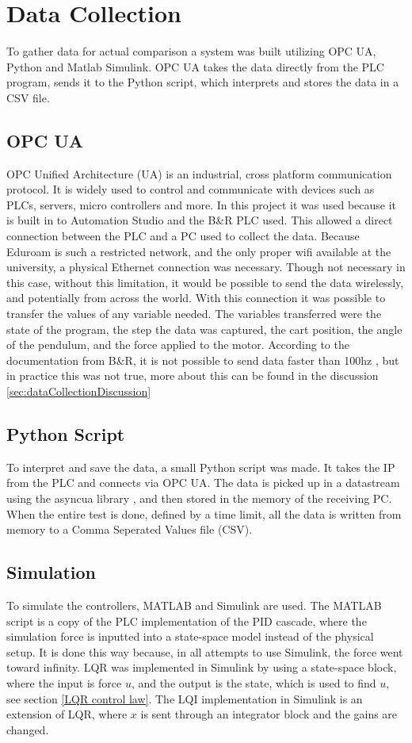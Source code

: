 \chapter{Data Collection}
\label{chap:datacollection}

To gather data for actual comparison a system was built utilizing OPC UA, Python and Matlab Simulink. OPC UA takes the data directly from the PLC program, sends it to the Python script, which interprets and stores the data in a CSV file.

\section{OPC UA}
OPC Unified Architecture (UA) is an industrial, cross platform communication protocol. It is widely used to control and communicate with devices such as PLCs, servers, micro controllers and more. In this project it was used because it is built in to Automation Studio and the B\&R PLC used. This allowed a direct connection between the PLC and a PC used to collect the data. Because Eduroam is such a restricted network, and the only proper wifi available at the university, a physical Ethernet connection was necessary. Though not necessary in this case, without this limitation, it would be possible to send the data wirelessly, and potentially from across the world. With this connection it was possible to transfer the values of any variable needed. The variables transferred were the state of the program, the step the data was captured, the cart position, the angle of the pendulum, and the force applied to the motor. According to the documentation from B\&R, it is not possible to send data faster than 100hz \cite{OPClimit}, but in practice this was not true, more about this can be found in the discussion \ref{sec:dataCollectionDiscussion}

\section{Python Script}
To interpret and save the data, a small Python script was made. It takes the IP from the PLC and connects via OPC UA. The data is picked up in a datastream using the asyncua library \cite{AsyncIO}, and then stored in the memory of the receiving PC. When the entire test is done, defined by a time limit, all the data is written from memory to a Comma Seperated Values file (CSV).

\section{Simulation}
To simulate the controllers, MATLAB and Simulink are used. The MATLAB script is a copy of the PLC implementation of the PID cascade, where the simulation force is inputted into a state-space model instead of the physical setup. It is done this way because, in all attempts to use Simulink, the force went toward infinity. LQR was implemented in Simulink by using a state-space block, where the input is force $u$, and the output is the state, which is used to find $u$, see section \ref{LQR control law}. The LQI implementation in Simulink is an extension of LQR, where $x$ is sent through an integrator block and the gains are changed.

